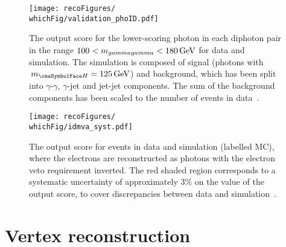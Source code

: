 \begin{figure}[hptb]
\centering 
\texttt{[image: recoFigures/\\whichFig/validation\_phoID.pdf]}
\caption[The \PhoIdBdt output score for the lower-scoring photon in each diphoton pair in the range $100 < m_{\gamma \gamma} < 180\GeV$ for data and simulation. The simulation is composed of signal (\Hgg photons with $\mH=125\GeV$) and background, which has been split into $\gamma$-$\gamma$, $\gamma$-$\textrm{jet}$ and $\textrm{jet}$-$\textrm{jet}$ components. The sum of the background components has been scaled to the number of events in data\quad\cite{CMS-PAS-HIG-16-020}.]
{The \PhoIdBdt output score for the lower-scoring photon in each diphoton pair in the range $100 < m_{\gamma \gamma} < 180\GeV$ for data and simulation. The simulation is composed of signal (\Hgg photons with $\mH=125\GeV$) and background, which has been split into $\gamma$-$\gamma$, $\gamma$-$\textrm{jet}$ and $\textrm{jet}$-$\textrm{jet}$ components. The sum of the background components has been scaled to the number of events in data~\cite{CMS-PAS-HIG-16-020}.}
\label{fig:reco:photon_id_score_hgg_bkg}
\end{figure}

\begin{figure}[hptb]
\centering 
\texttt{[image: recoFigures/\\whichFig/idmva\_syst.pdf]}
\caption[The \PhoIdBdt output score for \Zee events in data and simulation (labelled MC), where the electrons are reconstructed as photons with the electron veto requirement inverted. The red shaded region corresponds to a systematic uncertainty of approximately 3\% on the value of the output score, to cover discrepancies between data and simulation\quad\cite{CMS-PAS-HIG-16-020}.]{The \PhoIdBdt output score for \Zee events in data and simulation (labelled MC), where the electrons are reconstructed as photons with the electron veto requirement inverted. The red shaded region corresponds to a systematic uncertainty of approximately 3\% on the value of the output score, to cover discrepancies between data and simulation~\cite{CMS-PAS-HIG-16-020}.}
\label{fig:reco:photon_id_zee_validation}
\end{figure}


\section{Vertex reconstruction}
\label{reco:sec:vertex}

